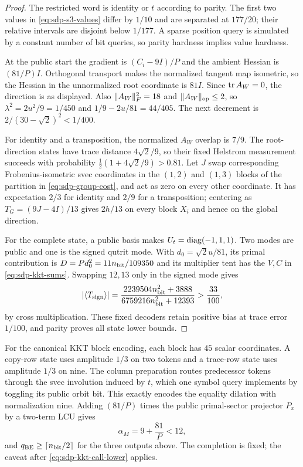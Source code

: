 \begin{proof}
The restricted word is identity or $t$ according to parity.  The first two
values in \eqref{eq:sdp-s3-values} differ by $1/10$ and are separated at
$177/20$; their relative intervals are disjoint below $1/177$.  A sparse
position query is simulated by a constant number of bit queries, so
parity hardness implies value hardness.

At the public start the gradient is $(C_i-9I)/P$ and the ambient Hessian is
$(81/P)I$.  Orthogonal transport makes the normalized tangent map isometric,
so the Hessian in the unnormalized root coordinate is $81I$.  Since $\operatorname{tr} A_W=0$, the direction is
as displayed.  Also $\lVert A_W\rVert_F^2=18$ and
$\lVert A_W\rVert_{\rm op}\leq2$, so
$\lambda^2=2u^2/9=1/450$ and
$1/9-2u/81=44/405$.  The next decrement is
$2/(30-\sqrt2)^2<1/400$.

For identity and a transposition, the normalized $A_W$ overlap is $7/9$.
The root-direction states have trace distance $4\sqrt2/9$, so their fixed
Helstrom measurement succeeds with probability
$\tfrac12(1+4\sqrt2/9)>0.81$.  Let $J$ swap corresponding
Frobenius-isometric svec coordinates in the $(1,2)$ and $(1,3)$ blocks of
the partition in \eqref{eq:sdp-group-cost}, and act as zero on every other coordinate.  It has expectation $2/3$
for identity and $2/9$ for a transposition; centering as
$T_G=(9J-4I)/13$ gives $2h/13$ on every block $X_i$ and hence on the
global direction.

For the complete state, a public basis makes $U_t=\operatorname{diag}(-1,1,1)$.  Two modes
are public and one is the signed qutrit mode.  With
$d_0=\sqrt2u/81$, its primal contribution is
$D=Pd_0^2=11n_{\rm bit}/109350$ and its multiplier tent has the $V,C$ in
\eqref{eq:sdp-kkt-sums}.  Swapping $12,13$ only in the signed mode gives
\begin{equation}
 |\langle T_{\rm sign}\rangle|
 =\frac{2239504n_{\rm bit}^2+3888}
        {6759216n_{\rm bit}^2+12393}>\frac{33}{100},        \label{eq:sdp-s3-complete-bias}
\end{equation}
by cross multiplication.  These fixed decoders retain positive bias at
trace error $1/100$, and parity proves all state lower bounds.
\end{proof}

For the canonical KKT block encoding, each block has $45$ scalar
coordinates.  A
copy-row state uses amplitude $1/3$ on two tokens and a trace-row state uses
amplitude $1/3$ on nine.  The column preparation routes predecessor tokens
through the svec involution induced by $t$, which one symbol query implements
by toggling its public orbit bit.  This exactly encodes the equality dilation
with normalization nine.  Adding $(81/P)$ times the public primal-sector
projector $P_x$ by a two-term LCU gives
\begin{equation}
 \alpha_M=9+\frac{81}{P}<12,                               \label{eq:sdp-s3-alpha}
\end{equation}
and $q_{\rm BE}\geq\lceil n_{\rm bit}/2\rceil$ for the three outputs above.
The completion is fixed; the caveat after \eqref{eq:sdp-kkt-call-lower}
applies.

